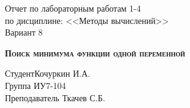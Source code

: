 \begin{titlepage}
\newpage



\begin{center}
\Large Отчет по лабораторным работам 1-4 \\ по дисциплине: <<Методы вычислений>> \\ Вариант 8
\end{center}

\vspace{12em}

\begin{center}
\textsc{\textbf{Поиск минимума функции одной переменной}}
\end{center}

\vspace{30em}

\begin{flushleft}
Студент\hrulefill Кочуркин И.А. \\
\vspace{1.5em}
Группа \hrulefill ИУ7-104\\
\vspace{1.5em}
Преподаватель \hrulefill Ткачев С.Б.\\
\vspace{1.5em}
\end{flushleft}

\vspace{13em}

\end{titlepage}

